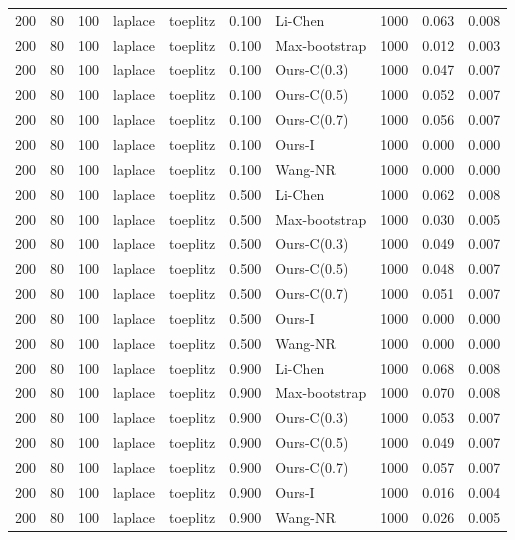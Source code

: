 \begin{tabular}{rrrllrlrrr}
200 & 80 & 100 & laplace & toeplitz & 0.100 & Li-Chen & 1000 & 0.063 & 0.008 \\
200 & 80 & 100 & laplace & toeplitz & 0.100 & Max-bootstrap & 1000 & 0.012 & 0.003 \\
200 & 80 & 100 & laplace & toeplitz & 0.100 & Ours-C(0.3) & 1000 & 0.047 & 0.007 \\
200 & 80 & 100 & laplace & toeplitz & 0.100 & Ours-C(0.5) & 1000 & 0.052 & 0.007 \\
200 & 80 & 100 & laplace & toeplitz & 0.100 & Ours-C(0.7) & 1000 & 0.056 & 0.007 \\
200 & 80 & 100 & laplace & toeplitz & 0.100 & Ours-I & 1000 & 0.000 & 0.000 \\
200 & 80 & 100 & laplace & toeplitz & 0.100 & Wang-NR & 1000 & 0.000 & 0.000 \\
200 & 80 & 100 & laplace & toeplitz & 0.500 & Li-Chen & 1000 & 0.062 & 0.008 \\
200 & 80 & 100 & laplace & toeplitz & 0.500 & Max-bootstrap & 1000 & 0.030 & 0.005 \\
200 & 80 & 100 & laplace & toeplitz & 0.500 & Ours-C(0.3) & 1000 & 0.049 & 0.007 \\
200 & 80 & 100 & laplace & toeplitz & 0.500 & Ours-C(0.5) & 1000 & 0.048 & 0.007 \\
200 & 80 & 100 & laplace & toeplitz & 0.500 & Ours-C(0.7) & 1000 & 0.051 & 0.007 \\
200 & 80 & 100 & laplace & toeplitz & 0.500 & Ours-I & 1000 & 0.000 & 0.000 \\
200 & 80 & 100 & laplace & toeplitz & 0.500 & Wang-NR & 1000 & 0.000 & 0.000 \\
200 & 80 & 100 & laplace & toeplitz & 0.900 & Li-Chen & 1000 & 0.068 & 0.008 \\
200 & 80 & 100 & laplace & toeplitz & 0.900 & Max-bootstrap & 1000 & 0.070 & 0.008 \\
200 & 80 & 100 & laplace & toeplitz & 0.900 & Ours-C(0.3) & 1000 & 0.053 & 0.007 \\
200 & 80 & 100 & laplace & toeplitz & 0.900 & Ours-C(0.5) & 1000 & 0.049 & 0.007 \\
200 & 80 & 100 & laplace & toeplitz & 0.900 & Ours-C(0.7) & 1000 & 0.057 & 0.007 \\
200 & 80 & 100 & laplace & toeplitz & 0.900 & Ours-I & 1000 & 0.016 & 0.004 \\
200 & 80 & 100 & laplace & toeplitz & 0.900 & Wang-NR & 1000 & 0.026 & 0.005 \\
\bottomrule
\end{tabular}
